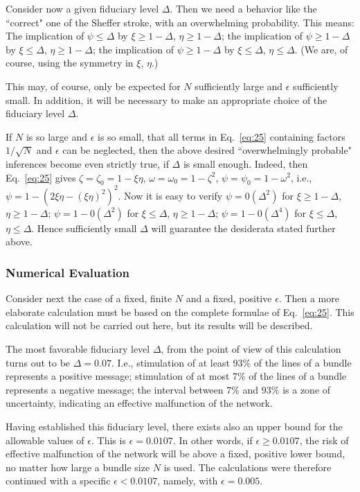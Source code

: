 \documentclass[twocolumn,preprintnumbers,amsmath,amssymb,floatfix]{revtex4}
\begin{document}
Consider now a given fiduciary level $\Delta$. Then we need a
behavior like the ``correct" one of the Sheffer stroke, with an
overwhelming probability. This means: The implication of
$\psi\leq\Delta$ by $\xi\geq1-\Delta$, $\eta\geq1-\Delta$; the
implication of $\psi\geq1-\Delta$ by $\xi\leq\Delta$,
$\eta\geq1-\Delta$; the implication of $\psi\geq1-\Delta$ by
$\xi\leq\Delta$, $\eta\leq\Delta$. (We are, of course, using the
symmetry in $\xi$, $\eta$.)

This may, of course, only be expected for $N$ sufficiently large
and $\epsilon$ sufficiently small. In addition, it will be
necessary to make an appropriate choice of the fiduciary level
$\Delta$.

If $N$ is so large and $\epsilon$ is so small, that all terms in
Eq.~\ref{eq:25} containing factors $1/\sqrt{N}$ and $\epsilon$ can
be neglected, then the above desired ``overwhelmingly probable"
inferences become even strictly true, if $\Delta$ is small enough.
Indeed, then Eq.~\ref{eq:25} gives $\zeta=\zeta_0=1-\xi\eta$,
$\omega=\omega_0=1-\zeta^2$, $\psi=\psi_0=1-\omega^2$, i.e.,
$\psi=1-(2\xi\eta-(\xi\eta)^2)^2$. Now it is easy to verify
$\psi=0(\Delta^2)$ for $\xi\geq1-\Delta$, $\eta\geq1-\Delta$;
$\psi=1-0(\Delta^2)$ for $\xi\leq\Delta$, $\eta\geq1-\Delta$;
$\psi=1-0(\Delta^4)$ for $\xi\leq\Delta$, $\eta\leq\Delta$. Hence
sufficiently small $\Delta$ will guarantee the desiderata stated
further above.

\subsubsection{\label{sec:ten5_2}Numerical Evaluation} Consider
next the case of a fixed, finite $N$ and a fixed, positive
$\epsilon$. Then a more elaborate calculation must be based on the
complete formulae of Eq.~\ref{eq:25}. This calculation will not be
carried out here, but its results will be described.

The most favorable fiduciary level $\Delta$, from the point of
view of this calculation turns out to be $\Delta=0.07$. I.e.,
stimulation of at least $93\%$ of the lines of a bundle represents
a positive message; stimulation of at most $7\%$ of the lines of a
bundle represents a negative message; the interval between $7\%$
and $93\%$ is a zone of uncertainty, indicating an effective
malfunction of the network.

Having established this fiduciary level, there exists also an
upper bound for the allowable values of $\epsilon$. This is
$\epsilon=0.0107$. In other words, if $\epsilon\geq0.0107$, the
risk of effective malfunction of the network will be above a
fixed, positive lower bound, no matter how large a bundle size $N$
is used. The calculations were therefore continued with a specific
$\epsilon<0.0107$, namely, with $\epsilon=0.005$.
\end{document}
